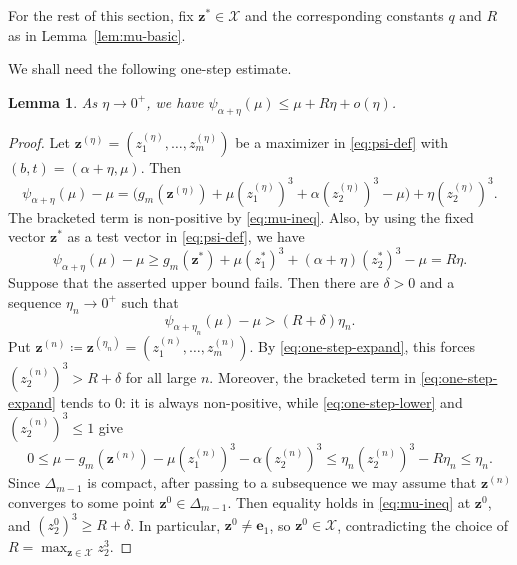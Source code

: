 \documentclass[10pt]{article}
\numberwithin{equation}{section}
\newtheorem{lemma}[theorem]{Lemma}
\begin{document}
For the rest of this section, fix $\mathbf{z}^*\in\mathcal X$ and the corresponding constants $q$ and $R$ as in Lemma~\ref{lem:mu-basic}.

We shall need the following one-step estimate.

\begin{lemma}\label{lem:one-step} As $\eta\to 0^+$, we have $\psi_{\alpha+\eta}(\mu)\le \mu+R\eta+o(\eta)$. \end{lemma}

\begin{proof}
Let $\mathbf{z}^{(\eta)}=(z_1^{(\eta)},\ldots,z_m^{(\eta)})$ be a maximizer in \eqref{eq:psi-def} with $(b,t)=(\alpha+\eta,\mu)$. Then
\begin{equation}
        \psi_{\alpha+\eta}(\mu)-\mu = \bigl(g_m(\mathbf{z}^{(\eta)})+\mu (z_1^{(\eta)})^3+\alpha (z_2^{(\eta)})^3-\mu\bigr) +\eta (z_2^{(\eta)})^3.
        \label{eq:one-step-expand}
\end{equation}
The bracketed term is non-positive by \eqref{eq:mu-ineq}. Also, by using the fixed vector $\mathbf{z}^*$ as a test vector in \eqref{eq:psi-def}, we have
\begin{equation}
        \psi_{\alpha+\eta}(\mu)-\mu \ge g_m(\mathbf{z}^*)+\mu (z_1^*)^3+(\alpha+\eta)(z_2^*)^3-\mu =R\eta.
        \label{eq:one-step-lower}
\end{equation}
Suppose that the asserted upper bound fails. Then there are $\delta>0$ and a sequence $\eta_n\to 0^+$ such that
\[
        \psi_{\alpha+\eta_n}(\mu)-\mu>(R+\delta)\eta_n.
\]
Put $\mathbf{z}^{(n)}\coloneqq \mathbf{z}^{(\eta_n)}=(z_1^{(n)},\ldots,z_m^{(n)})$. By \eqref{eq:one-step-expand}, this forces $(z_2^{(n)})^3>R+\delta$ for all large $n$. Moreover, the bracketed term in \eqref{eq:one-step-expand} tends to $0$: it is always non-positive, while \eqref{eq:one-step-lower} and $(z_2^{(n)})^3\le 1$ give
\[
        0\le \mu-g_m(\mathbf{z}^{(n)})-\mu (z_1^{(n)})^3-\alpha (z_2^{(n)})^3 \le \eta_n (z_2^{(n)})^3-R\eta_n \le \eta_n.
\]
Since $\Delta_{m-1}$ is compact, after passing to a subsequence we may assume that $\mathbf{z}^{(n)}$ converges to some point $\mathbf{z}^0\in\Delta_{m-1}$. Then equality holds in \eqref{eq:mu-ineq} at $\mathbf{z}^0$, and $(z_2^0)^3\ge R+\delta$. In particular, $\mathbf{z}^0\ne\mathbf{e}_1$, so $\mathbf{z}^0\in\mathcal X$, contradicting the choice of $R=\max_{\mathbf{z}\in\mathcal X}z_2^3$.
\end{proof}
\end{document}
